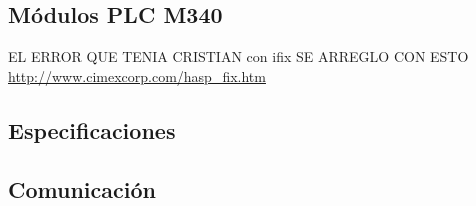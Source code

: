 \subsection{Módulos PLC M340}

EL ERROR QUE TENIA CRISTIAN con ifix SE ARREGLO CON ESTO
\url{http://www.cimexcorp.com/hasp_fix.htm}
\subsection{Especificaciones}
\subsection{Comunicación}




	\newpage